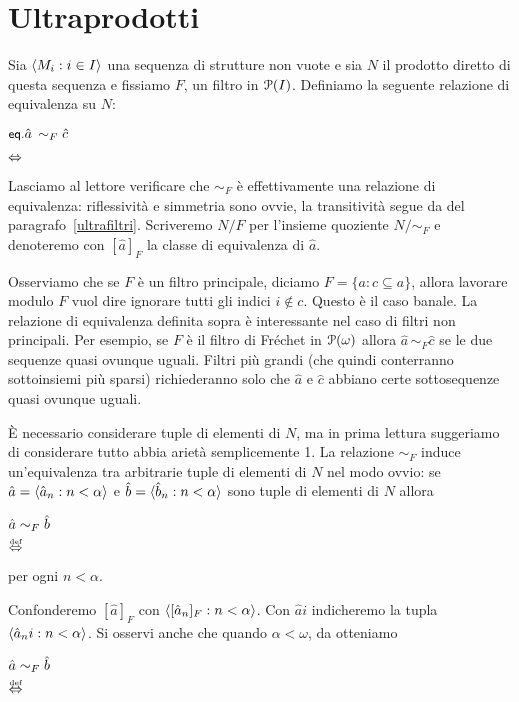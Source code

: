 \section{Ultraprodotti}

\def\ceq#1#2#3{\parbox{25ex}{$\displaystyle #1$}\parbox{6ex}{\hfil$\displaystyle #2$}\rlap{$\displaystyle  #3$}\hspace{20ex}}


Sia $\<M_i : i\in I\>$ una sequenza di strutture non vuote e sia $N$ il prodotto diretto di questa sequenza e fissiamo $F$, un filtro in $\P(I)$.  Definiamo la seguente relazione di equivalenza su $N$:

\ceq{\ssf{eq.}\hfill \hat a\,\sim_F \hat c}{\IFF}{\Big\{\, i\in I\ :\ \hat ai=\hat ci\,\Big\}\in F\,.}


Lasciamo al lettore verificare che $\sim_F$ \`e effettivamente una relazione di equivalenza: riflessivit\`a e simmetria sono ovvie, la transitivit\`a segue da  del paragrafo~\ref{ultrafiltri}. Scriveremo $N/F$ per l'insieme quoziente $N/\mathord\sim_F$ e denoteremo con $[\hat a]_F$ la classe di equivalenza di $\hat a$. 

Osserviamo che se $F$ \`e un filtro principale, diciamo $F=\{a:c\subseteq a\}$, allora lavorare modulo $F$ vuol dire ignorare tutti gli indici $i\notin c$. Questo \`e il caso banale. La relazione di equivalenza definita sopra \`e interessante nel caso di filtri non principali. Per esempio, se $F$ \`e il filtro di Fr\'echet in $\P(\omega)$ allora $\hat a\,\sim_F \hat c$ se le due sequenze quasi ovunque uguali. Filtri pi\`u grandi (che quindi conterranno sottoinsiemi pi\`u sparsi) richiederanno solo che $\hat a$ e $\hat c$ abbiano certe sottosequenze quasi ovunque uguali.  

\`E necessario considerare tuple di elementi di $N$, ma in prima lettura suggeriamo di considerare tutto abbia ariet\`a semplicemente 1. La relazione $\sim_F$ induce un'equivalenza tra arbitrarie tuple di elementi di $N$ nel modo ovvio: se $\hat a=\<\hat a_n:n<\alpha\>$ e $\hat b=\<\hat b_n:n<\alpha\>$ sono tuple di elementi di $N$ allora

\ceq{\hfill \hat a\sim_F \hat b}{\dIFF}{\hat a_n\sim_F\hat b_n} per ogni $n<\alpha$.

Confonderemo $[\hat a]_F$ con $\<[\hat a_n]_F:n<\alpha\>$. Con $\hat ai$ indicheremo la tupla $\<\hat a_ni:n<\alpha\>$. Si osservi anche che quando $\alpha<\omega$, da  otteniamo

\ceq{\hfill \hat a\sim_F \hat b}{\dIFF}{\Big\{\, i\in I\ :\ \hat ai=\hat ci\,\Big\}\in F\,.}



